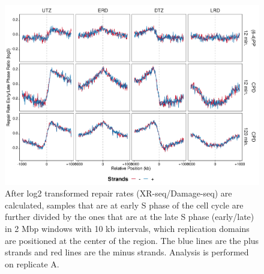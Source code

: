 \begin{figure}[H]
\begin{center}
\includegraphics[width=\textwidth]{Chapters/7_appendix/figures/supfig28}
\caption[Repair rate early/late phase ratio of replication domains in 2 Mbp (replicate A).]{After log2 transformed repair rates (XR-seq/Damage-seq) are calculated, samples that are at early S phase of the cell cycle are further divided by the ones that are at the late S phase (early/late) in 2 Mbp windows with 10 kb intervals, which replication domains are positioned at the center of the region. The blue lines are the plus strands and red lines are the minus strands. Analysis is performed on replicate A.}
\label{supfig:rrel2000repdomainA}
\end{center}
\end{figure}

